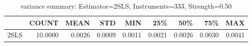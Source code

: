 \begin{table}[ht]
\centering
\caption{variance summary: Estimator=2SLS, Instruments=333, Strength=0.50}
\begin{tabular}{lrrrrrrrr}
\toprule
 & COUNT & MEAN & STD & MIN & 25\% & 50\% & 75\% & MAX \\
\midrule
2SLS & 10.0000 & 0.0026 & 0.0009 & 0.0011 & 0.0021 & 0.0026 & 0.0030 & 0.0041 \\
\bottomrule
\end{tabular}
\end{table}
